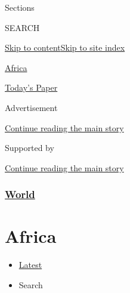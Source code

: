 Sections

SEARCH

\protect\hyperlink{site-content}{Skip to
content}\protect\hyperlink{site-index}{Skip to site index}

\href{https://www.nytimes3xbfgragh.onion/section/world/africa}{Africa}

\href{https://myaccount.nytimes3xbfgragh.onion/auth/login?response_type=cookie\&client_id=vi}{}

\href{https://www.nytimes3xbfgragh.onion/section/todayspaper}{Today's
Paper}

Advertisement

\protect\hyperlink{after-top}{Continue reading the main story}

Supported by

\protect\hyperlink{after-sponsor}{Continue reading the main story}

\hypertarget{world}{%
\subsubsection{\texorpdfstring{\href{/section/world}{World}}{World}}\label{world}}

\hypertarget{africa}{%
\section{Africa}\label{africa}}

\begin{itemize}
\tightlist
\item
  \protect\hyperlink{stream-panel}{Latest}
\item
  Search
\end{itemize}

